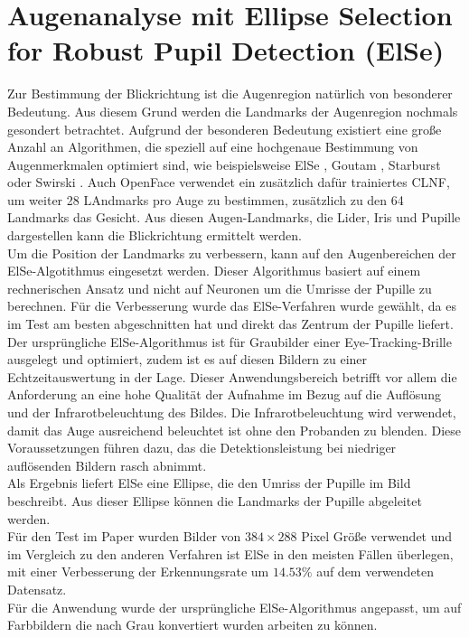 \section{Augenanalyse mit Ellipse Selection for Robust Pupil Detection (ElSe)}
\label{ElSe}
Zur Bestimmung der Blickrichtung ist die Augenregion natürlich von besonderer Bedeutung. Aus diesem Grund werden die Landmarks der Augenregion nochmals gesondert betrachtet. Aufgrund der besonderen Bedeutung existiert eine große Anzahl an Algorithmen, die speziell auf eine hochgenaue Bestimmung von Augenmerkmalen optimiert sind, wie beispielsweise ElSe \cite{ElSe}, Goutam \cite{Eye_FastCorner}, Starburst \cite{Starburst} oder Swirski \cite{Swirski2012}. Auch OpenFace verwendet ein zusätzlich dafür trainiertes CLNF, um weiter 28 LAndmarks pro Auge zu bestimmen, zusätzlich zu den 64 Landmarks das Gesicht. Aus diesen Augen-Landmarks, die Lider, Iris und Pupille dargestellen kann die Blickrichtung ermittelt werden.\\
Um die Position der Landmarks zu verbessern, kann auf den Augenbereichen der ElSe-Algotithmus eingesetzt werden. Dieser Algorithmus basiert auf einem rechnerischen Ansatz und nicht auf Neuronen um die Umrisse der Pupille zu berechnen. Für die Verbesserung wurde das ElSe-Verfahren wurde gewählt, da es im Test \cite{ElSe} am besten abgeschnitten hat und direkt das Zentrum der Pupille liefert.\\
Der ursprüngliche ElSe-Algorithmus ist für Graubilder einer Eye-Tracking-Brille ausgelegt und optimiert, zudem ist es auf diesen Bildern zu einer Echtzeitauswertung in der Lage. Dieser Anwendungsbereich betrifft vor allem die Anforderung an eine hohe Qualität der Aufnahme im Bezug auf die Auflösung und der Infrarotbeleuchtung des Bildes. Die Infrarotbeleuchtung wird verwendet, damit das Auge ausreichend beleuchtet ist ohne den Probanden zu blenden. Diese Voraussetzungen führen dazu, das die Detektionsleistung bei niedriger auflösenden Bildern rasch abnimmt.\\
Als Ergebnis liefert ElSe eine Ellipse, die den Umriss der Pupille im Bild beschreibt. Aus dieser Ellipse können die Landmarks der Pupille abgeleitet werden.\\
Für den Test im Paper wurden Bilder von $384\times 288$ Pixel Größe verwendet und im Vergleich zu den anderen Verfahren ist ElSe in den meisten Fällen überlegen, mit einer Verbesserung der Erkennungsrate um $14.53\%$ auf dem verwendeten Datensatz.\cite{ElSe}\\
Für die Anwendung wurde der ursprüngliche ElSe-Algorithmus angepasst, um auf Farbbildern die nach Grau konvertiert wurden arbeiten zu können.
